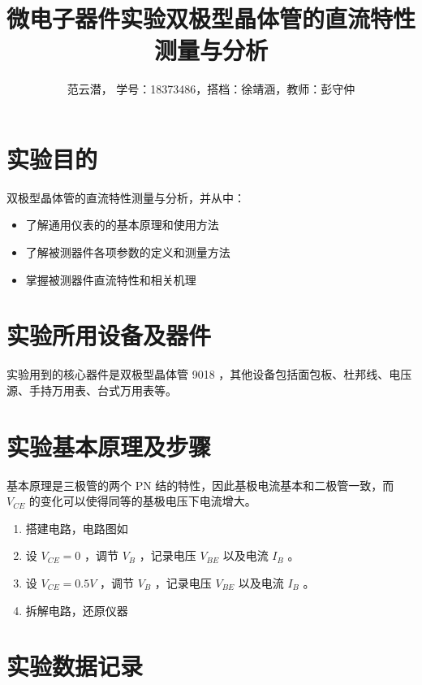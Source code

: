 \documentclass[lang=cn,11pt,a4paper,cite=authoryear]{elegantpaper}
\title{微电子器件实验\quad 双极型晶体管的直流特性测量与分析}
\author{范云潜， 学号：18373486，搭档：徐靖涵，教师：彭守仲}
\institute{微电子学院 184111 班}
\date{\zhdate{2020/10/19}}
\begin{document}
\maketitle


\section{实验目的}

双极型晶体管的直流特性测量与分析，并从中：

\begin{itemize}
    \item 了解通用仪表的的基本原理和使用方法
    \item 了解被测器件各项参数的定义和测量方法
    \item 掌握被测器件直流特性和相关机理
\end{itemize}

\section{实验所用设备及器件}

实验用到的核心器件是双极型晶体管 9018 ，其他设备包括面包板、杜邦线、电压源、手持万用表、台式万用表等。

\section{实验基本原理及步骤}

基本原理是三极管的两个 PN 结的特性，因此基极电流基本和二极管一致，而 \(V_{CE}\) 的变化可以使得同等的基极电压下电流增大。

\begin{enumerate}
    \item 搭建电路，电路图如
    \item 设 \(V_{CE} = 0\) ，调节 \(V_B\) ，记录电压 \(V_{BE}\) 以及电流 \(I_B\) 。
    \item 设 \(V_{CE} = 0.5 V\) ，调节 \(V_B\) ，记录电压 \(V_{BE}\) 以及电流 \(I_B\) 。
    \item 拆解电路，还原仪器
\end{enumerate}


\section{实验数据记录}
\end{document}
